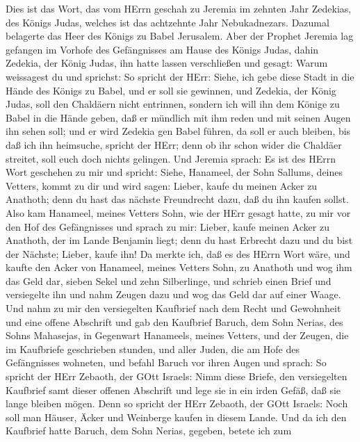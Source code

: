  Dies ist das Wort, das vom HErrn geschah zu Jeremia im
zehnten Jahr Zedekias, des Königs Judas, welches ist das achtzehnte Jahr
Nebukadnezars.  Dazumal belagerte das Heer des Königs zu
Babel Jerusalem. Aber der Prophet Jeremia lag gefangen im Vorhofe des
Gefängnisses am Hause des Königs Judas,  dahin Zedekia, der
König Judas, ihn hatte lassen verschließen und gesagt: Warum weissagest
du und sprichst: So spricht der HErr: Siehe, ich gebe diese Stadt in die
Hände des Königs zu Babel, und er soll sie gewinnen,  und
Zedekia, der König Judas, soll den Chaldäern nicht entrinnen, sondern
ich will ihn dem Könige zu Babel in die Hände geben, daß er mündlich mit
ihm reden und mit seinen Augen ihn sehen soll;  und er wird
Zedekia gen Babel führen, da soll er auch bleiben, bis daß ich ihn
heimsuche, spricht der HErr; denn ob ihr schon wider die Chaldäer
streitet, soll euch doch nichts gelingen.  Und Jeremia
sprach: Es ist des HErrn Wort geschehen zu mir und spricht: 
Siehe, Hanameel, der Sohn Sallums, deines Vetters, kommt zu dir und wird
sagen: Lieber, kaufe du meinen Acker zu Anathoth; denn du hast das
nächste Freundrecht dazu, daß du ihn kaufen sollst.  Also
kam Hanameel, meines Vetters Sohn, wie der HErr gesagt hatte, zu mir vor
den Hof des Gefängnisses und sprach zu mir: Lieber, kaufe meinen Acker
zu Anathoth, der im Lande Benjamin liegt; denn du hast Erbrecht dazu und
du bist der Nächste; Lieber, kaufe ihn! Da merkte ich, daß es des HErrn
Wort wäre,  und kaufte den Acker von Hanameel, meines
Vetters Sohn, zu Anathoth und wog ihm das Geld dar, sieben Sekel und
zehn Silberlinge,  und schrieb einen Brief und versiegelte
ihn und nahm Zeugen dazu und wog das Geld dar auf einer Waage.
 Und nahm zu mir den versiegelten Kaufbrief nach dem Recht
und Gewohnheit und eine offene Abschrift  und gab den
Kaufbrief Baruch, dem Sohn Nerias, des Sohns Mahasejas, in Gegenwart
Hanameels, meines Vetters, und der Zeugen, die im Kaufbriefe geschrieben
stunden, und aller Juden, die am Hofe des Gefängnisses wohneten,
 und befahl Baruch vor ihren Augen und sprach:
 So spricht der HErr Zebaoth, der GOtt Israels: Nimm diese
Briefe, den versiegelten Kaufbrief samt dieser offenen Abschrift und
lege sie in ein irden Gefäß, daß sie lange bleiben mögen. 
Denn so spricht der HErr Zebaoth, der GOtt Israels: Noch soll man
Häuser, Äcker und Weinberge kaufen in diesem Lande.  Und da
ich den Kaufbrief hatte Baruch, dem Sohn Nerias, gegeben, betete ich zum

